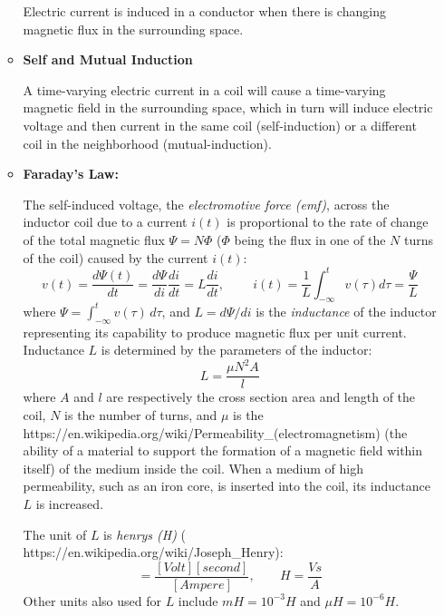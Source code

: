 \documentclass{article}
\begin{document}
\begin{itemize}
\begin{itemize}
    Electric current is induced in a conductor when there is changing
    magnetic flux in the surrounding space.

    

  \item {\bf Self and Mutual Induction}

    A time-varying electric current in a coil will cause a time-varying 
    magnetic field in the surrounding space, which in turn will induce 
    electric voltage and then current in the same coil (self-induction) 
    or a different coil in the neighborhood (mutual-induction).
    
  \item {\bf Faraday's Law:} 
    
    The self-induced voltage, the {\em electromotive force (emf)}, across 
    the inductor coil due to a current $i(t)$ is proportional to the rate 
    of change of the total magnetic flux $\Psi=N\Phi$ ($\Phi$ being the 
    flux in one of the $N$ turns of the coil) caused by the current $i(t)$: 
    \begin{equation} 
      v(t)=\frac{d\Psi(t)}{dt}=\frac{d\Psi}{di}\frac{di}{dt}=L\frac{di}{dt},
      \;\;\;\;\;\;\;\;
      i(t)=\frac{1}{L}\int_{-\infty}^t v(\tau) d\tau=\frac{\Psi}{L}
    \end{equation}
    where $\Psi=\int_{-\infty}^t v(\tau)\,d\tau$, and $L=d\Psi/di$ is 
    the {\em inductance} of the inductor representing its capability to 
    produce magnetic flux per unit current.
    Inductance $L$ is determined by the parameters of the inductor: 
    \begin{equation}
      L=\frac{\mu N^2 A}{l}
    \end{equation}
    where $A$ and $l$ are respectively the cross section area and 
    length of the coil, $N$ is the number of turns, and $\mu$ is the
    {https://en.wikipedia.org/wiki/Permeability_(electromagnetism)}
    (the ability of a material to support the 
    formation of a magnetic field within itself) of the medium inside 
    the coil. When a medium of high permeability, such as an iron core, 
    is inserted into the coil, its inductance $L$ is increased.

    The unit of $L$ is {\em henrys (H)}
    (
    {https://en.wikipedia.org/wiki/Joseph_Henry}):
    \begin{equation} 
      [Henry]=\frac{[Volt][second]}{[Ampere]},
      \;\;\;\;\;\;\; H=\frac{Vs}{A}
    \end{equation}
    Other units also used for $L$ include $mH=10^{-3}H$ and $\mu H=10^{-6}H$. 


\end{itemize}
\end{itemize}
\end{document}
